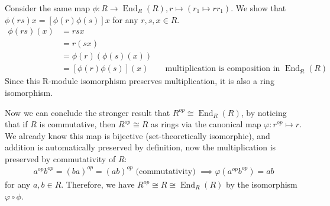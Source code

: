 \documentclass{article}
\theoremstyle{plain}
\DeclareMathOperator{\End}{End}
\begin{document}
Consider the same map $\phi:R\to\End_{R}(R),r\mapsto(r_{1}\mapsto rr_{1})$. We show that
$\phi(rs)x=[\phi(r)\phi(s)]x$ for any $r,s,x\in R$.
\begin{align*}
  \phi(rs)(x)&=rsx\\
          &=r(sx)\\
          &=\phi(r)(\phi(s)(x))\\
          &=[\phi(r)\phi(s)](x)&&\text{multiplication is composition in $\End_{R}(R)$}.
\end{align*}
Since this R-module isomorphism preserves multiplication, it is also a ring isomorphism.

Now we can conclude the stronger result that $R^{op}\cong\End_{R}(R)$, by noticing
that if $R$ is commutative, then $R^{op}\cong R$ as rings via the canonical map
$\varphi:r^{op}\mapsto r$. We already know this map is bijective (set-theoretically
isomorphic), and addition is automatically preserved by definition, now the
multiplication is preserved by commutativity of $R$:
\begin{align*}
a^{op}b^{op}=(ba)^{op}=(ab)^{op}\text{ (commutativity) }\implies \varphi(a^{op}b^{op})=ab
\end{align*}
for any $a, b\in R$. Therefore, we have $R^{op}\cong R\cong\End_{R}(R)$ by the isomorphism $\varphi\circ\phi$.
\end{document}
